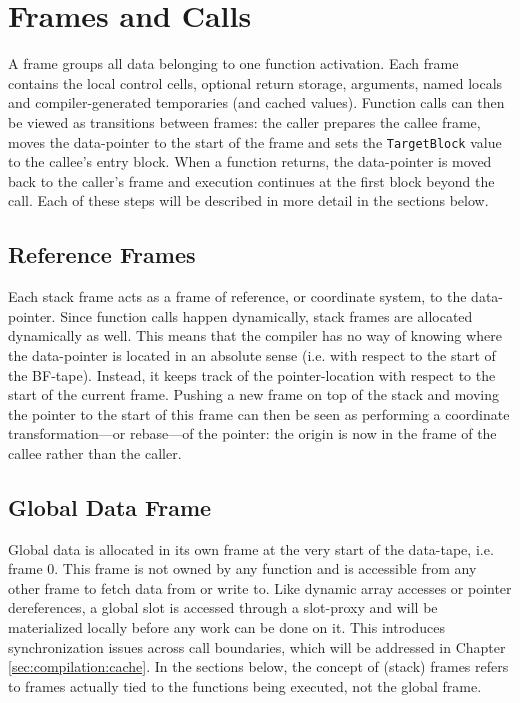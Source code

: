 \section{Frames and Calls}
\label{sec:compilation:frames}
A frame groups all data belonging to one function activation. Each frame contains the local control cells, optional return storage, arguments, named locals and compiler-generated temporaries (and cached values). Function calls can then be viewed as transitions between frames: the caller prepares the callee frame, moves the data-pointer to the start of the frame and sets the \texttt{TargetBlock} value to the callee's entry block. When a function returns, the data-pointer is moved back to the caller's frame and execution continues at the first block beyond the call. Each of these steps will be described in more detail in the sections below.

\subsection{Reference Frames}
\label{sec:compilation:referenceframes}
Each stack frame acts as a frame of reference, or coordinate system, to the data-pointer. Since function calls happen dynamically, stack frames are allocated dynamically as well. This means that the compiler has no way of knowing where the data-pointer is located in an absolute sense (i.e. with respect to the start of the BF-tape). Instead, it keeps track of the pointer-location with respect to the start of the current frame. Pushing a new frame on top of the stack and moving the pointer to the start of this frame can then be seen as performing a coordinate transformation---or rebase---of the pointer: the origin is now in the frame of the callee rather than the caller.

\subsection{Global Data Frame}
\label{sec:compilation:globalframe}
Global data is allocated in its own frame at the very start of the data-tape, i.e. frame 0. This frame is not owned by any function and is accessible from any other frame to fetch data from or write to. Like dynamic array accesses or pointer dereferences, a global slot is accessed through a slot-proxy and will be materialized locally before any work can be done on it. This introduces synchronization issues across call boundaries, which will be addressed in Chapter \ref{sec:compilation:cache}. In the sections below, the concept of (stack) frames refers to frames actually tied to the functions being executed, not the global frame.

